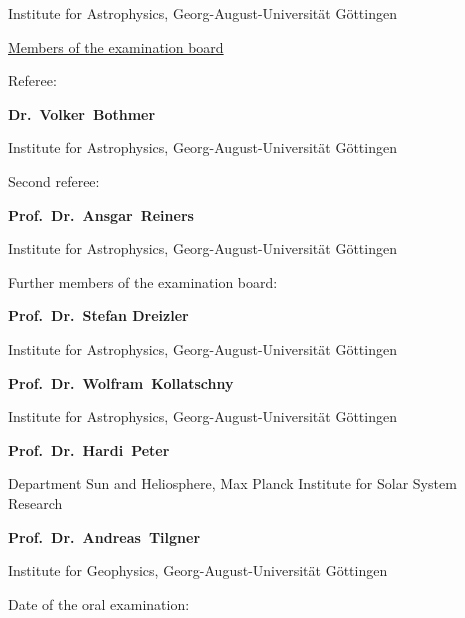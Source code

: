 Institute for Astrophysics, Georg-August-Universität Göttingen
% 
\vspace{3\baselineskip}

\noindent \underline{Members of the examination board}
\vspace{\baselineskip}

\noindent Referee:
\medskip

\textbf{Dr.~Volker~Bothmer}

Institute for Astrophysics, Georg-August-Universität Göttingen
\vspace{\baselineskip}

\noindent Second referee:
\medskip

\textbf{Prof.~Dr.~Ansgar~Reiners}

Institute for Astrophysics, Georg-August-Universität Göttingen
% 
% 
\vspace{\baselineskip}

\noindent Further members of the examination board:
\medskip

\textbf{Prof.~Dr.~Stefan Dreizler}

Institute for Astrophysics, Georg-August-Universität Göttingen
\vspace{\baselineskip}

\textbf{Prof.~Dr.~Wolfram~Kollatschny}

Institute for Astrophysics, Georg-August-Universität Göttingen
\vspace{\baselineskip}

\textbf{Prof.~Dr.~Hardi~Peter}

Department Sun and Heliosphere, Max Planck Institute for Solar System Research
\vspace{\baselineskip}

\textbf{Prof.~Dr.~Andreas~Tilgner}

Institute for Geophysics, Georg-August-Universität Göttingen
\vspace{3\baselineskip}

\noindent Date of the oral examination: \underline{\hspace{3cm}}


\cleardoublepage


